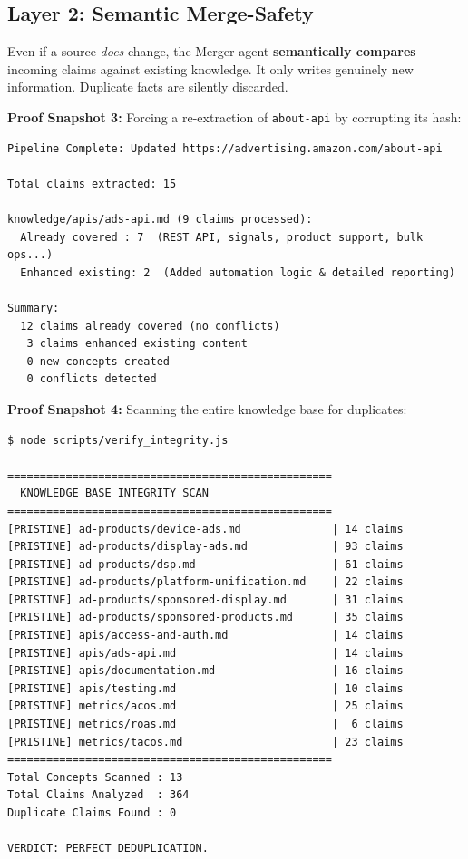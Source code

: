 \documentclass[11pt,a4paper]{article}
\begin{document}
\subsection{Layer 2: Semantic Merge-Safety}

\begin{infobox}
Even if a source \textit{does} change, the Merger agent \textbf{semantically compares} incoming claims against existing knowledge. It only writes genuinely new information. Duplicate facts are silently discarded.
\end{infobox}

\textbf{Proof Snapshot 3:} Forcing a re-extraction of \texttt{about-api} by corrupting its hash:
\begin{lstlisting}
Pipeline Complete: Updated https://advertising.amazon.com/about-api

Total claims extracted: 15

knowledge/apis/ads-api.md (9 claims processed):
  Already covered : 7  (REST API, signals, product support, bulk ops...)
  Enhanced existing: 2  (Added automation logic & detailed reporting)

Summary:
  12 claims already covered (no conflicts)
   3 claims enhanced existing content
   0 new concepts created
   0 conflicts detected
\end{lstlisting}

\textbf{Proof Snapshot 4:} Scanning the entire knowledge base for duplicates:
\begin{lstlisting}
$ node scripts/verify_integrity.js

==================================================
  KNOWLEDGE BASE INTEGRITY SCAN
==================================================
[PRISTINE] ad-products/device-ads.md              | 14 claims
[PRISTINE] ad-products/display-ads.md             | 93 claims
[PRISTINE] ad-products/dsp.md                     | 61 claims
[PRISTINE] ad-products/platform-unification.md    | 22 claims
[PRISTINE] ad-products/sponsored-display.md       | 31 claims
[PRISTINE] ad-products/sponsored-products.md      | 35 claims
[PRISTINE] apis/access-and-auth.md                | 14 claims
[PRISTINE] apis/ads-api.md                        | 14 claims
[PRISTINE] apis/documentation.md                  | 16 claims
[PRISTINE] apis/testing.md                        | 10 claims
[PRISTINE] metrics/acos.md                        | 25 claims
[PRISTINE] metrics/roas.md                        |  6 claims
[PRISTINE] metrics/tacos.md                       | 23 claims
==================================================
Total Concepts Scanned : 13
Total Claims Analyzed  : 364
Duplicate Claims Found : 0

VERDICT: PERFECT DEDUPLICATION.
\end{lstlisting}
\end{document}
